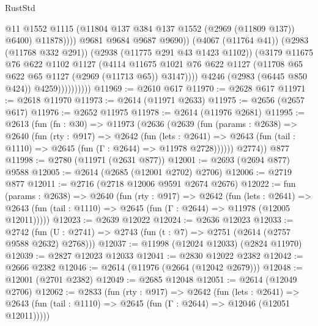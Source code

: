 \begin{lexlean}{RustStd}
\begin{coremodule}
                                      @11
                                      @1552
                                      @1115
                                      (@11804 @137 @384 @137 @1552 (@2969 (@11809 @137)) @6400)
                                      @11878))))
                              @9681
                              @9684
                              @9687
                              @9690))
                          (@4067 (@11764 @41))
                          (@2983 (@11768 @332 @291))
                          (@2938 (@11775 @291 @43 @1423 @1102))
                          (@3179
                            @11675
                            @76
                            @622
                            @1102
                            @1127
                            (@4114
                              @11675
                              @1021
                              @76
                              @622
                              @1127
                              (@11708 @65 @622 @65 @1127 (@2969 (@11713 @65)) @3147))))
                        @4246
                        (@2983 (@6445 @850 @424))
                        @4259))))))))))
@11969 := @2610 @617
@11970 := @2628 @617
@11971 := @2618 @11970
@11973 := @2614 (@11971 @2633)
@11975 := @2656 (@2657 @617)
@11976 := @2652 @11975
@11978 := @2614 (@11976 @2681)
@11995 := @2613
    (fun (fn : @30) =>
    @11973
      (@2636
        (@2639
          (fun (params : @2638) =>
          @2640
            (fun (rty : @917) =>
            @2642
              (fun (lets : @2641) =>
              @2643 (fun (tail : @1110) => @2645 (fun (Γ : @2644) => @11978 @2728))))))
        @2774))
    @877
@11998 := @2780 (@11971 (@2631 @877))
@12001 := @2693 (@2694 @877) @9588
@12005 := @2614 (@2685 (@12001 @2702) @2706)
@12006 := @2719 @877
@12011 := @2716 (@2718 @12006 @9591 @2674 @2676)
@12022 := fun (params : @2638) =>
  @2640
    (fun (rty : @917) =>
    @2642
      (fun (lets : @2641) =>
      @2643 (fun (tail : @1110) => @2645 (fun (Γ : @2644) => @11978 (@12005 @12011)))))
@12023 := @2639 @12022
@12024 := @2636 @12023
@12033 := @2742 (fun (U : @2741) => @2743 (fun (t : @7) => @2751 (@2614 (@2757 @9588 @2632) @2768)))
@12037 := @11998 (@12024 @12033) (@2824 @11970)
@12039 := @2827 @12023 @12033
@12041 := @2830 @12022 @2382
@12042 := @2666 @2382
@12046 := @2614 (@11976 (@2664 (@12042 @2679)))
@12048 := @12001 (@2701 @2382)
@12049 := @2685 @12048
@12051 := @2614 (@12049 @2706)
@12062 := @2833
    (fun (rty : @917) =>
    @2642
      (fun (lets : @2641) =>
      @2643 (fun (tail : @1110) => @2645 (fun (Γ : @2644) => @12046 (@12051 @12011)))))

\end{coremodule}
\end{lexlean}
